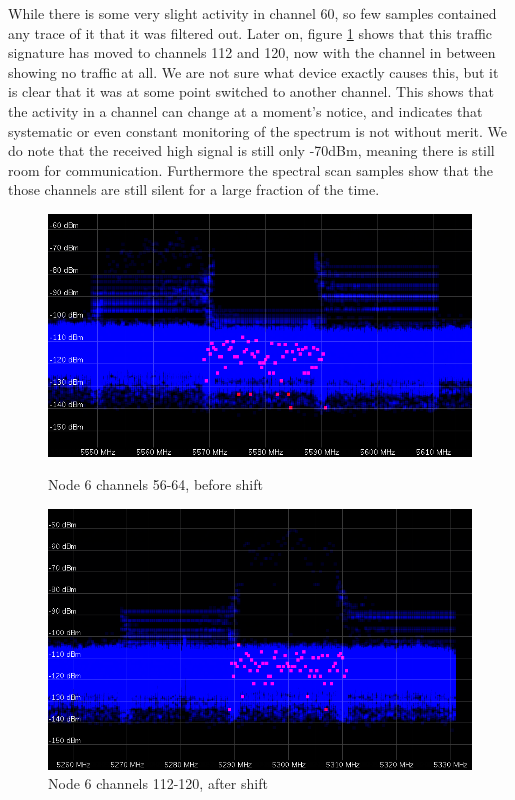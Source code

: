 \documentclass[a4paper, 11pt]{article}
\begin{document}
 While there is some very slight activity in channel 60, so few samples contained any trace of it that it was filtered out. Later on, figure \ref{cot6_50_late} shows that this traffic signature has moved to channels 112 and 120, now with the channel in between showing no traffic at all. We are not sure what device exactly causes this, but it is clear that it was at some point switched to another channel. This shows that the activity in a channel can change at a moment's notice, and indicates that systematic or even constant monitoring of the spectrum is not without merit. We do note that the received high signal is still only -70dBm, meaning there is still room for communication. Furthermore the spectral scan samples show that the those channels are still silent for a large fraction of the time.



\begin{figure}
\begin{minipage}[t]{0.47\textwidth}
\centering
\includegraphics[width=\textwidth]{cot6_50_early.png}
\caption{Node 6 channels 56-64, before shift}
\label{cot6_50_early}
\end{minipage}\hfill
\begin{minipage}[t]{0.47\textwidth}
\centering
\includegraphics[width=\textwidth]{cot6_50_late.png}
\caption{Node 6 channels 112-120, after shift}
\label{cot6_50_late}
\end{minipage}\hfill
\end{figure}
\end{document}
